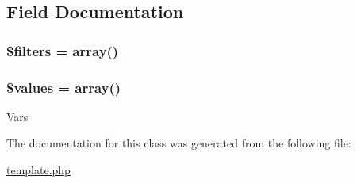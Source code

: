 \subsection{Field Documentation}
\hypertarget{classtemplate_ae222f32233a38635bef58d24a13c9df5}{
\subsubsection[{\$filters}]{\setlength{\rightskip}{0pt plus 5cm}\$filters = array()}}
\label{classtemplate_ae222f32233a38635bef58d24a13c9df5}
\hypertarget{classtemplate_affc45c6ace2eeb3f300b054dbf9592b6}{
\subsubsection[{\$values}]{\setlength{\rightskip}{0pt plus 5cm}\$values = array()}}
\label{classtemplate_affc45c6ace2eeb3f300b054dbf9592b6}
Vars 

The documentation for this class was generated from the following file:\begin{DoxyCompactItemize}
\item 
\hyperlink{template_8php}{template.php}\end{DoxyCompactItemize}
